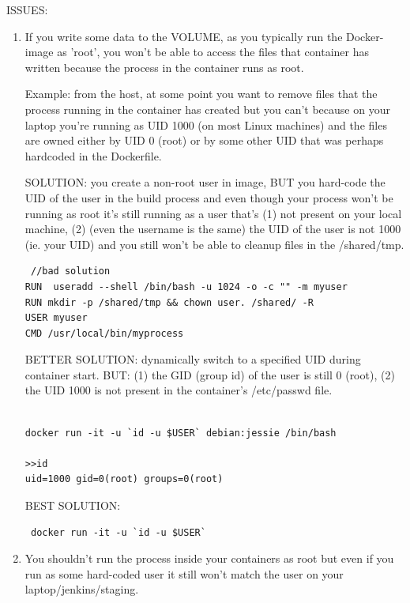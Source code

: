 ISSUES:
\begin{enumerate}
  
  \item  If you write some data to the VOLUME, as you typically run the
  Docker-image as 'root', you won't be able to access the files that container
  has written because the process in the container runs as root.
  
 Example: from the host, at some point you want to remove files that the process
 running in the container has created but you can't because on your laptop
 you're running as UID 1000 (on most Linux machines) and the files are owned
 either by UID 0 (root) or by some other UID that was perhaps hardcoded in the
 Dockerfile.
 
 SOLUTION: you create a non-root user in image, BUT you hard-code the UID of the
 user in the build process and even though your process won't be running as root
 it's still running as a user that's (1) not present on your local machine, (2)
 (even the username is the same) the UID of the user is not 1000 (ie. your UID)
 and you still won't be able to cleanup files in the /shared/tmp.
 
 \begin{verbatim}
 //bad solution
RUN  useradd --shell /bin/bash -u 1024 -o -c "" -m myuser
RUN mkdir -p /shared/tmp && chown user. /shared/ -R
USER myuser
CMD /usr/local/bin/myprocess
 \end{verbatim}
 
 BETTER SOLUTION: dynamically switch to a specified UID during container start.
 BUT: (1) the GID (group id) of the user is still 0 (root), (2) the UID 1000 is
 not present in the container's /etc/passwd file.

 \begin{verbatim}

docker run -it -u `id -u $USER` debian:jessie /bin/bash

>>id
uid=1000 gid=0(root) groups=0(root)
 \end{verbatim}
 
 BEST SOLUTION:
 \begin{verbatim}
 docker run -it -u `id -u $USER` 
 \end{verbatim}
  
  \item You shouldn't run the process inside your containers as root but even if
  you run as some hard-coded user it still won't match the user on your
  laptop/jenkins/staging.
  
\end{enumerate}

